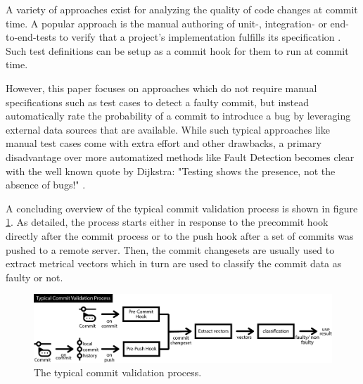 A variety of approaches exist
for analyzing the quality of code changes at commit time. A popular approach is the manual authoring of unit-, integration- or end-to-end-tests to verify that a project's implementation fulfills its specification \cite{Maayan2018}. Such test definitions can be setup as a commit hook for them to run at commit time.

However, this paper focuses on approaches which do not require manual specifications such as test cases to detect a faulty commit, but instead automatically rate the probability of a commit to introduce a bug by leveraging external data sources that are available.
While such typical approaches like manual test cases come with extra effort and other drawbacks, a primary disadvantage over more automatized methods like Fault Detection becomes clear with the well known quote by Dijkstra: "Testing shows the presence, not the absence of bugs!" \cite{JohnN1969}.

A concluding overview of the typical commit validation process is shown in figure \ref{fig:cvprocess}. As detailed, the process starts either in response to the precommit hook directly after the commit process or to the push hook after a set of commits was pushed to a remote server. Then, the commit changesets are usually used to extract metrical vectors which in turn are used to classify the commit data as faulty or not.

\begin{figure}[t]
	\centering
	\includegraphics[width=\textwidth]{images/commitvalidation-process/typicalprocess-pdf}
	\caption{The typical commit validation process.}
	\label{fig:cvprocess}
\end{figure}

